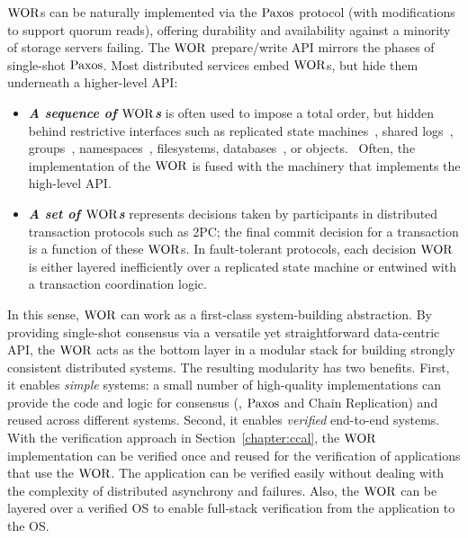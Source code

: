 $\mathrm{WOR}$s can be naturally implemented via the $\mathrm{Paxos}$ protocol (with modifications to support quorum reads), 
offering durability and availability against a minority of storage servers failing. 
The $\mathrm{WOR}$  prepare/write API mirrors the phases of single-shot $\mathrm{Paxos}$. 
Most distributed services embed $\mathrm{WOR}$s, but hide them underneath a higher-level API:

\begin{itemize}
\item \textbf{\textit{A sequence of $\mathrm{WOR}$s}} is often used to impose a total order, but hidden behind restrictive interfaces such as replicated state machines~\cite{smr, rvrpaxos}, shared logs~\cite{corfu}, groups~\cite{GC, horus}, namespaces~\cite{chubby, zookeeper}, filesystems, databases~\cite{hyder}, or objects.~\cite{tango} Often, the implementation of the $\mathrm{WOR}$ is fused with the machinery that implements the high-level API.

\item \textbf{\textit{A set of $\mathrm{WOR}$s}} represents decisions taken by participants in distributed transaction protocols such as 2PC; the final commit decision for a transaction is a function of these $\mathrm{WOR}$s. In fault-tolerant protocols, each decision $\mathrm{WOR}$ is either layered inefficiently over a replicated state machine or entwined with a transaction coordination logic.~\cite{gray:2006}
\end{itemize}

In this sense, $\mathrm{WOR}$ can work as a first-class system-building abstraction.
By providing single-shot consensus via a versatile yet straightforward data-centric API, 
the $\mathrm{WOR}$ acts as the bottom layer in a modular stack for building strongly consistent distributed systems. 
The resulting modularity has two benefits.
First, it enables \textit{simple} systems: a small number of high-quality implementations can provide the code and logic for consensus
(\eg, $\mathrm{Paxos}$ and Chain Replication) and reused across different systems. 
Second, it enables \textit{verified} end-to-end systems.
With the verification approach in Section~\ref{chapter:ccal}, 
the $\mathrm{WOR}$ implementation can be verified once and reused for the verification of applications that use the $\mathrm{WOR}$.
The application can be verified easily without dealing with the complexity of distributed asynchrony and failures. 
Also, the $\mathrm{WOR}$ can be layered over a verified OS to enable full-stack verification from the application to the OS. 

